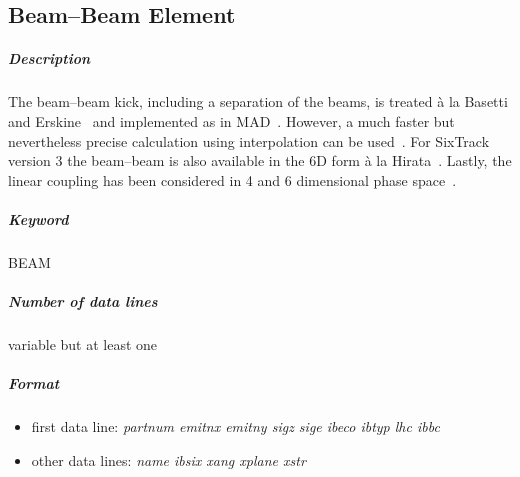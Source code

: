 \documentclass[a4paper,11pt]{report}
\begin{document}
\subsection{Beam--Beam Element} \label{BeamBeam}

\subparagraph{Description} The beam--beam kick, including a separation
of the beams, is treated \`{a} la Basetti and Erskine~\cite{BasErs}
and implemented as in MAD~\cite{MAD}. However, a much faster but
nevertheless precise calculation using interpolation can be
used~\cite{ERIC}. For SixTrack version 3 the beam--beam is also
available in the 6D form \`{a} la Hirata~\cite{Hirata}. Lastly, the
linear coupling has been considered in 4 and 6 dimensional phase
space~\cite{ripbeam}. 

\subparagraph{Keyword} BEAM 
\subparagraph{Number of data lines} variable but at least one

\subparagraph{Format} 
\begin{itemize}
\item first data line: {\em partnum emitnx emitny sigz sige ibeco
    ibtyp lhc ibbc} 
\item other data lines: {\em name ibsix xang xplane xstr}
\end{itemize}
\end{document}
